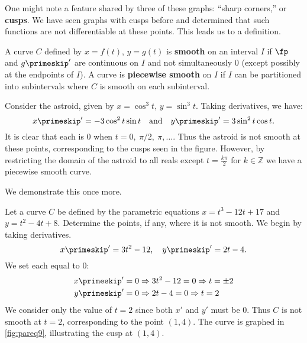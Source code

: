 One might note a feature shared by three of these graphs: ``sharp corners,'' or \textbf{cusps}. We have seen graphs with cusps before and determined that such functions are not differentiable at these points. This leads us to a definition.

\begin{definition}[Smooth]\label{def:smooth}
A curve $C$ defined by $x=f(t)$, $y=g(t)$ is \textbf{smooth} on an interval $I$ if $\fp$ and $g\primeskip'$ are continuous on $I$ and not simultaneously 0 (except possibly at the endpoints of $I$). A curve is \textbf{piecewise smooth} on $I$ if $I$ can be partitioned into subintervals where $C$ is smooth on each subinterval.
\end{definition}

Consider the astroid, given by $x=\cos^3t$, $y=\sin^3t$. Taking derivatives, we have:
\[
x\primeskip' = -3\cos^2t\sin t\quad \text{and}\quad y\primeskip' = 3\sin^2t\cos t.
\]
It is clear that each is 0 when $t=0,\ \pi/2,\ \pi,\dotsc$. Thus the astroid is not smooth at these points, corresponding to the cusps seen in the figure. However, by restricting the domain of the astroid to all reals except $t = \frac{k\pi}{2}$ for $k \in\mathbb{Z}$ we have a piecewise smooth curve.

We demonstrate this once more.

\begin{example}\label{ex_pareq9}
Let a curve $C$ be defined by the parametric equations $x=t^3-12t+17$ and $y=t^2-4t+8$. Determine the points, if any, where it is not smooth.
\solution
We begin by taking derivatives.
%
%
\[x\primeskip' = 3t^2-12,\quad y\primeskip' = 2t-4.\]
We set each equal to 0:
\begin{align*}
 x\primeskip' =0 &\Rightarrow 3t^2-12=0 \Rightarrow t=\pm 2\\
 y\primeskip' =0 &\Rightarrow 2t-4 = 0 \Rightarrow t=2
\end{align*}
We consider only the value of $t=2$ since both $x'$ and $y'$ must be 0. Thus $C$ is not smooth at $t=2$, corresponding to the point $(1,4)$. The curve is graphed in \autoref{fig:pareq9}, illustrating the cusp at $(1,4)$.
\end{example}

